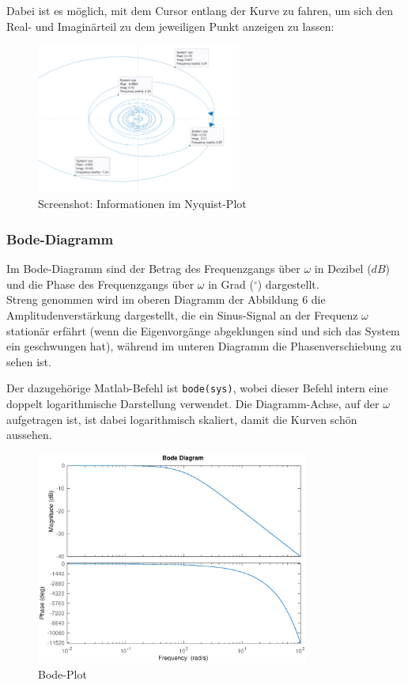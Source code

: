  Dabei ist es möglich, mit dem Cursor entlang der Kurve zu fahren, um sich den Real- und Imaginärteil zu dem jeweiligen Punkt anzeigen zu lassen:
 \begin{figure}[H]
    \label{fig:nyquistCursor}
    \centering
    \includegraphics[width=0.6\textwidth]{Bilder/NyquistCursorPT1Tt.png}
    \caption{Screenshot: Informationen im Nyquist-Plot}
 \end{figure}

 
\subsubsection{Bode-Diagramm}
Im Bode-Diagramm sind der Betrag des Frequenzgangs über $\omega$ in Dezibel ($dB$) und die Phase des Frequenzgangs über $\omega$ in Grad ($^\circ$) dargestellt.\\
Streng genommen wird im oberen Diagramm der Abbildung 6 die Amplitudenverstärkung dargestellt, die ein Sinus-Signal an der Frequenz $\omega$ stationär erfährt (wenn die Eigenvorgänge abgeklungen sind und sich das System ein geschwungen hat), während im unteren Diagramm die Phasenverschiebung zu sehen ist.  

Der dazugehörige Matlab-Befehl ist \texttt{bode(sys)}, wobei dieser Befehl intern eine doppelt logarithmische Darstellung verwendet. Die Diagramm-Achse, auf der $\omega$ aufgetragen ist, ist dabei logarithmisch skaliert, damit die Kurven schön aussehen.

\begin{figure}[H]
    \label{fig:bodePlot}
    \label{fig:lassmich}
    \centering
    \includegraphics[width=0.8\textwidth]{Bilder/BodePT1Tt.eps}
    \caption{Bode-Plot}
 \end{figure}

